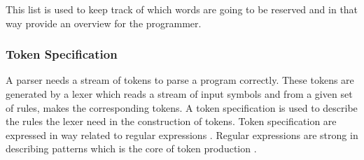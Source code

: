 
This list is used to keep track of which words are going to be reserved and in that way provide an overview for the programmer. 

\subsubsection{Token Specification}
A parser needs a stream of tokens to parse a program correctly. These tokens are generated by a lexer which reads a stream of input symbols and from a given set of rules, makes the corresponding tokens. A token specification is used to describe the rules the lexer need in the construction of tokens. Token specification are expressed in way related to regular expressions \citep{sebesta}. Regular expressions are strong in describing patterns which is the core of token production \citep{sipser}.

